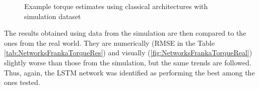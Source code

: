 \begin{figure}
    \centering
    \hfill
    \caption{Example torque estimates using classical architectures with simulation dataset}
    \label{fig:ConvLSTMResTeret}
\end{figure}

The results obtained using data from the simulation are then compared to the ones from the real world. They are numerically (RMSE in the Table \ref{tab:NetworksFrankaTorqueRes}) and visually (\cref{fig:NetworksFrankaTorqueReal}) slightly worse than those from the simulation, but the same trends are followed. Thus, again, the LSTM network was identified as performing the best among the ones tested. 

